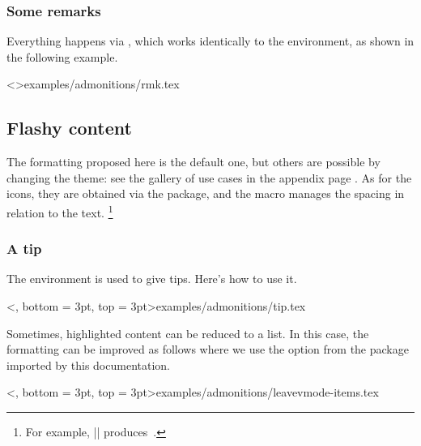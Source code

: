 \subsubsection{Some remarks}

Everything happens via , which works identically to the  environment, as shown in the following example.

\tdoclatexinput<>{examples/admonitions/rmk.tex}


\subsection{Flashy content}
\label{tutodoc-admonitions}

\begin{tdocnote}
    The formatting proposed here is the default one, but others are possible by changing the theme: see the gallery of use cases in the appendix page \pageref{tutodoc-theme-gallery}.
    As for the icons, they are obtained via the  package, and the  macro manages the spacing in relation to the text.
    \footnote{
        For example,
        \tdoclatexin||
        produces
        \,.
    }
\end{tdocnote}


\subsubsection{A tip}

The  environment is used to give tips. Here's how to use it.

\tdoclatexinput<, bottom = 3pt, top = 3pt>{examples/admonitions/tip.tex}


\smallskip


\begin{tdoctip}
    Sometimes, highlighted content can be reduced to a list. In this case, the formatting can be improved as follows where we use the  option from the  package imported by this documentation.

    \tdoclatexinput<, bottom = 3pt, top = 3pt>{examples/admonitions/leavevmode-items.tex}
\end{tdoctip}


